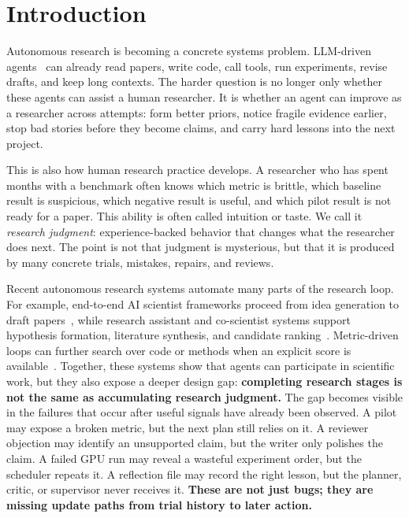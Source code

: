 \documentclass{article}
\begin{document}
\section{Introduction}

Autonomous research is becoming a concrete systems problem. LLM-driven agents~\citep{wu2023autogen,lu2024aiscientistfullyautomated,boiko2023autonomouschemicalresearch} can already read papers, write code, call tools, run experiments, revise drafts, and keep long contexts. The harder question is no longer only whether these agents can assist a human researcher. It is whether an agent can improve as a researcher across attempts: form better priors, notice fragile evidence earlier, stop bad stories before they become claims, and carry hard lessons into the next project.

This is also how human research practice develops. A researcher who has spent months with a benchmark often knows which metric is brittle, which baseline result is suspicious, which negative result is useful, and which pilot result is not ready for a paper. This ability is often called intuition or taste. We call it \emph{research judgment}: experience-backed behavior that changes what the researcher does next. The point is not that judgment is mysterious, but that it is produced by many concrete trials, mistakes, repairs, and reviews.

Recent autonomous research systems automate many parts of the research loop. For example, end-to-end AI scientist frameworks proceed from idea generation to draft papers~\citep{lu2024aiscientistfullyautomated,yamada2025aiscientistv2workshoplevelautomated}, while research assistant and co-scientist systems support hypothesis formation, literature synthesis, and candidate ranking~\citep{schmidgall2025agentlaboratoryusingllm,gottweis2025aicoscientist,ghareeb2025robinmultiagentautomatingscientific}. Metric-driven loops can further search over code or methods when an explicit score is available~\citep{karpathy2026autoresearch}. Together, these systems show that agents can participate in scientific work, but they also expose a deeper design gap: \textbf{completing research stages is not the same as accumulating research judgment.} The gap becomes visible in the failures that occur after useful signals have already been observed. A pilot may expose a broken metric, but the next plan still relies on it. A reviewer objection may identify an unsupported claim, but the writer only polishes the claim. A failed GPU run may reveal a wasteful experiment order, but the scheduler repeats it. A reflection file may record the right lesson, but the planner, critic, or supervisor never receives it. \textbf{These are not just bugs; they are missing update paths from trial history to later action.}
\end{document}
